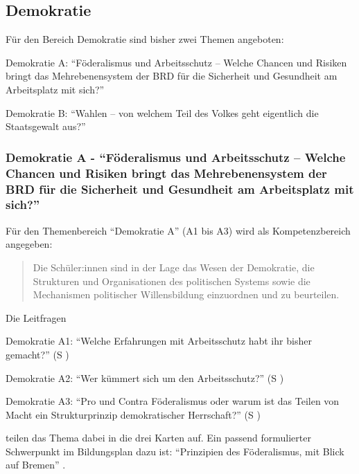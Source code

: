 \subsection{Demokratie \label{Denmokratie}}
Für den Bereich Demokratie sind bisher zwei Themen angeboten:
\begin{myenumerate}
    \item Demokratie A: \enquote{Föderalismus und Arbeitsschutz – Welche Chancen und Risiken bringt das Mehrebenensystem der BRD für die Sicherheit und Gesundheit am Arbeitsplatz mit sich?}
    \item Demokratie B: \enquote{Wahlen – von welchem Teil des Volkes geht eigentlich die Staatsgewalt aus?}
\end{myenumerate}



\subsubsection{Demokratie A - \enquote{Föderalismus und Arbeitsschutz – Welche Chancen und Risiken bringt das Mehrebenensystem der BRD für die Sicherheit und Gesundheit am Arbeitsplatz mit sich?} \label{DemokratieA}}

Für den Themenbereich \enquote{Demokratie A} (A1 bis A3) wird als Kompetenzbereich angegeben:
\begin{quote}
    Die Schüler:innen sind in der Lage das Wesen der Demokratie, die Strukturen und Organisationen des politischen Systems sowie die Mechanismen politischer Willensbildung einzuordnen und zu beurteilen.
    
    \autocite[im Bildungsplan:][16]{bplan}
\end{quote}


Die Leitfragen
\begin{myenumerate}
    \item Demokratie A1: \enquote{Welche Erfahrungen mit Arbeitsschutz habt ihr bisher gemacht?} (\gls{S} \pageref{DEMOKRATIE-A1})
    \item Demokratie A2: \enquote{Wer kümmert sich um den Arbeitsschutz?} (\gls{S} \pageref{DEMOKRATIE-A2})
    \item Demokratie A3: \enquote{Pro und Contra Föderalismus oder warum ist das Teilen von Macht ein Strukturprinzip demokratischer Herrschaft?} (\gls{S} \pageref{DEMOKRATIE-A3})
\end{myenumerate}
teilen das Thema dabei in die drei Karten auf.
Ein passend formulierter Schwerpunkt im Bildungsplan dazu ist: \enquote{Prinzipien des Föderalismus, mit Blick auf Bremen} \autocite[16]{bplan}.


